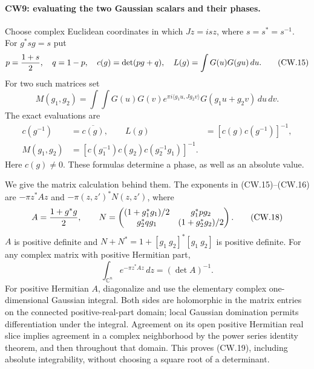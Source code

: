 \paragraph{CW9: evaluating the two Gaussian scalars and their phases.}
Choose complex Euclidean coordinates in which $Jz=is z$, where
$s=s^*=s^{-1}$.  For $g^*sg=s$ put
\[
 p={1+s\over2},\quad q=1-p,\quad
 c(g)=\det(pg+q),\quad
 L(g)=\int G(u)G(gu)\,du .                             \tag{CW.15}
\]
For two such matrices set
\[
 M(g_1,g_2)=\int\!\int G(u)G(v)
       e^{\pi i\langle g_1u,Jg_2v\rangle}G(g_1u+g_2v)\,du\,dv.
                                                               \tag{CW.16}
\]
The exact evaluations are
\[
 \begin{split}
 c(g^{-1})&=\overline{c(g)},\qquad
 L(g)&=[c(g)c(g^{-1})]^{-1},\\
 M(g_1,g_2)&=[c(g_1^{-1})c(g_2)c(g_2^{-1}g_1)]^{-1}.
 \end{split}                                                   \tag{CW.17}
\]
Here $c(g)\ne0$.  These formulas determine a phase, as well as
an absolute value.

We give the matrix calculation behind them.  The exponents in
(CW.15)--(CW.16) are $-\pi z^*Az$ and $-\pi(z,z')^*N(z,z')$,
where
\[
 A={1+g^*g\over2},\qquad
 N=\begin{pmatrix}
 (1+g_1^*g_1)/2&g_1^*pg_2\\
 g_2^*qg_1&(1+g_2^*g_2)/2
 \end{pmatrix}.                                                \tag{CW.18}
\]
$A$ is positive definite and
$N+N^*=1+[g_1\ g_2]^*[g_1\ g_2]$ is positive definite.
For any complex matrix with positive Hermitian part,
\[
              \int_{\mathbb C^n}e^{-\pi z^*Az}\,dz=(\det A)^{-1}.
                                                               \tag{CW.19}
\]
For positive Hermitian $A$, diagonalize and use the elementary
complex one-dimensional Gaussian integral.  Both sides are
holomorphic in the matrix entries on the connected positive-real-part
domain; local Gaussian domination permits differentiation under the
integral.  Agreement on its open positive Hermitian real slice
implies agreement in a complex neighborhood by the power series
identity theorem, and then throughout that domain.  This proves
(CW.19), including absolute integrability, without choosing a square
root of a determinant.

